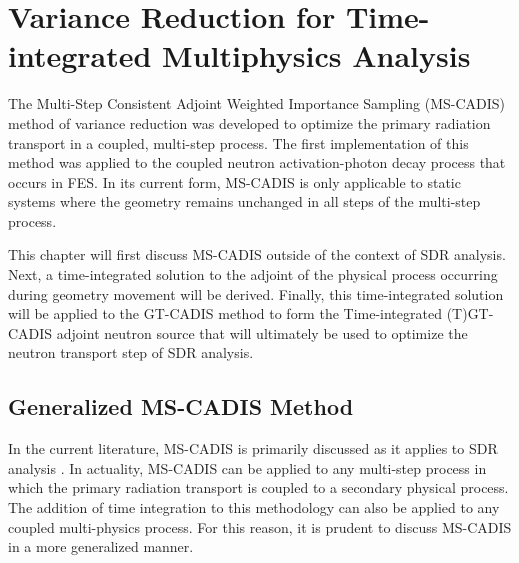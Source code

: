 \chapter{Variance Reduction for Time-integrated Multiphysics Analysis}\label{ch:tgt}

The Multi-Step Consistent Adjoint Weighted Importance Sampling (MS-CADIS)
method of variance reduction 
was developed to optimize the primary radiation transport
in a coupled, multi-step process. The first implementation of this method 
was applied to the coupled neutron activation-photon decay process that occurs
in FES.  
In its current form, MS-CADIS is only applicable to static systems where
the geometry remains unchanged in all steps of the multi-step process.

This chapter will first discuss MS-CADIS outside of the context of SDR analysis. 
Next, a time-integrated solution to the adjoint of the 
physical process occurring during geometry movement will be derived.  
Finally, this time-integrated solution will be applied to the GT-CADIS method to
form the Time-integrated (T)GT-CADIS adjoint neutron source that will
ultimately be used to optimize the neutron transport step of SDR analysis.

\section{Generalized MS-CADIS Method}
In the current literature, MS-CADIS is primarily discussed as it applies to SDR
analysis \cite{mscadis}.  In actuality, MS-CADIS can be applied to any multi-step process in
which the primary radiation transport is coupled to a secondary physical process.
The addition of time integration to this methodology can also be applied to
any coupled multi-physics process. For this reason, it is prudent to discuss
MS-CADIS in a more generalized manner.

